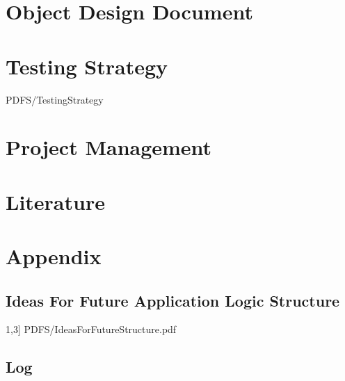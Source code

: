 \documentclass{article}
\begin{document}
\section{Object Design Document}
	
\section{Testing Strategy}
	 {PDFS/TestingStrategy}
\section{Project Management}
	

\section{Literature }

\section{Appendix}
\subsection{Ideas For Future Application Logic Structure}
	{1,3}] {PDFS/IdeasForFutureStructure.pdf}
\subsection{Log}
	
\end{document}
